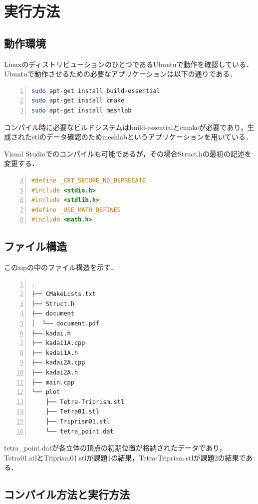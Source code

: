 \documentclass[a4paper,10pt]{jsarticle}
\begin{document}
\section{実行方法}
\subsection{動作環境}
LinuxのディストリビューションのひとつであるUbuntuで動作を確認している．
Ubuntuで動作させるための必要なアプリケーションは以下の通りである．

\begin{lstlisting}[basicstyle=\ttfamily\footnotesize, language=Bash, frame=single, firstnumber=1, numbers=left, breaklines=true]
sudo apt-get install build-essential
sudo apt-get install cmake
sudo apt-get install meshlab
\end{lstlisting}

コンパイル時に必要なビルドシステムはbuild-essentialとcmakeが必要であり，生成されたstlのデータ確認のためmeshlabというアプリケーションを用いている．

Visual Studioでのコンパイルも可能であるが，その場合Struct.hの最初の記述を変更する．

\begin{lstlisting}[basicstyle=\ttfamily\footnotesize, language=C, frame=single, firstnumber=4, numbers=left, breaklines=true]
#define _CRT_SECURE_NO_DEPRECATE
#include <stdio.h>
#include <stdlib.h>
#define _USE_MATH_DEFINES
#include <math.h>
\end{lstlisting}

\subsection{ファイル構造}
このzipの中のファイル構造を示す．

\begin{lstlisting}[basicstyle=\ttfamily\footnotesize, language=Bash, frame=single, firstnumber=1, numbers=left, breaklines=true]
.
├── CMakeLists.txt
├── Struct.h
├── document
│  └── document.pdf
├── kadai.h
├── kadai1A.cpp
├── kadai1A.h
├── kadai2A.cpp
├── kadai2A.h
├── main.cpp
└── plot
    ├── Tetra-Triprism.stl
    ├── Tetra01.stl
    ├── Triprism01.stl
    └── tetra_point.dat
\end{lstlisting}
tetra\_point.datが各立体の頂点の初期位置が格納されたデータであり，Tetra01.stlとTriprism01.stlが課題1の結果，Tetra-Triprism.stlが課題2の結果である．

\subsection{コンパイル方法と実行方法}
\end{document}
